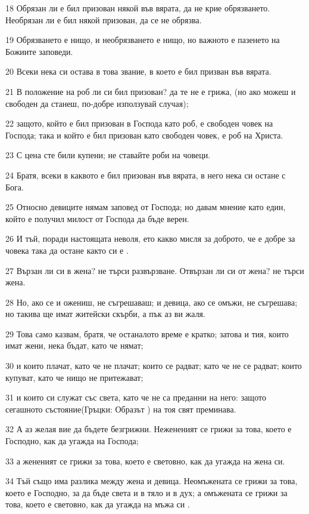 \par 18 Обрязан ли е бил призован някой във вярата, да не крие обрязването. Необрязан ли е бил някой призован, да се не обрязва.
\par 19 Обрязването е нищо, и необрязването е нищо, но важното е пазенето на Божиите заповеди.
\par 20 Всеки нека си остава в това звание, в което е бил призван във вярата.
\par 21 В положение на роб ли си бил призован? да те не е грижа, (но ако можеш и свободен да станеш, по-добре използувай случая);
\par 22 защото, който е бил призован в Господа като роб, е свободен човек на Господа; така и който е бил призован като свободен човек, е роб на Христа.
\par 23 С цена сте били купени; не ставайте роби на човеци.
\par 24 Братя, всеки в каквото е бил призован във вярата, в него нека си остане с Бога.
\par 25 Относно девиците нямам заповед от Господа; но давам мнение като един, който е получил милост от Господа да бъде верен.
\par 26 И тъй, поради настоящата неволя, ето какво мисля за доброто, че е добре за човека така да остане както си е .
\par 27 Вързан ли си в жена? не търси развързване. Отвързан ли си от жена? не търси жена.
\par 28 Но, ако се и ожениш, не съгрешаваш; и девица, ако се омъжи, не съгрешава; но такива ще имат житейски скърби, а пък аз ви жаля.
\par 29 Това само казвам, братя, че останалото време е кратко; затова и тия, които имат жени, нека бъдат, като че нямат;
\par 30 и които плачат, като че не плачат; които се радват; като че не се радват; които купуват, като че нищо не притежават;
\par 31 и които си служат със света, като че не са преданни на него: защото сегашното състояние(Гръцки: Образът ) на тоя свят преминава.
\par 32 А аз желая вие да бъдете безгрижни. Нежененият се грижи за това, което е Господно, как да угажда на Господа;
\par 33 а жененият се грижи за това, което е световно, как да угажда на жена си.
\par 34 Тъй също има разлика между жена и девица. Неомъжената се грижи за това, което е Господно, за да бъде света и в тяло и в дух; а омъжената се грижи за това, което е световно, как да угажда на мъжа си .
